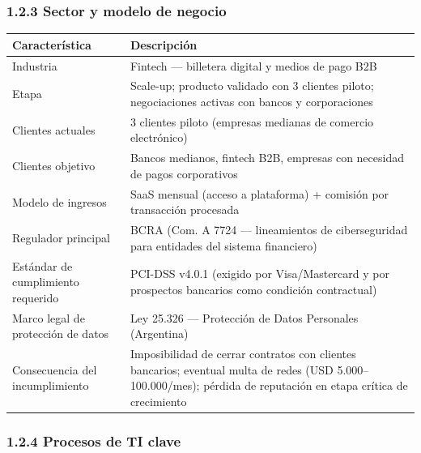 \documentclass[11pt,a4paper]{article}
\begin{document}
\subsubsection{1.2.3 Sector y modelo de negocio}

\begin{tabularx}{\textwidth}{P{5cm}L}
\toprule
\textbf{Característica} & \textbf{Descripción} \\
\midrule
Industria & Fintech — billetera digital y medios de pago B2B \\
Etapa & Scale-up; producto validado con 3 clientes piloto; negociaciones activas con bancos y corporaciones \\
Clientes actuales & 3 clientes piloto (empresas medianas de comercio electrónico) \\
Clientes objetivo & Bancos medianos, fintech B2B, empresas con necesidad de pagos corporativos \\
Modelo de ingresos & SaaS mensual (acceso a plataforma) + comisión por transacción procesada \\
Regulador principal & BCRA (Com. A 7724 — lineamientos de ciberseguridad para entidades del sistema financiero) \\
Estándar de cumplimiento requerido & PCI-DSS v4.0.1 (exigido por Visa/Mastercard y por prospectos bancarios como condición contractual) \\
Marco legal de protección de datos & Ley 25.326 — Protección de Datos Personales (Argentina) \\
Consecuencia del incumplimiento & Imposibilidad de cerrar contratos con clientes bancarios; eventual multa de redes (USD 5.000–100.000/mes); pérdida de reputación en etapa crítica de crecimiento \\
\bottomrule
\end{tabularx}

\subsubsection{1.2.4 Procesos de TI clave}
\end{document}
